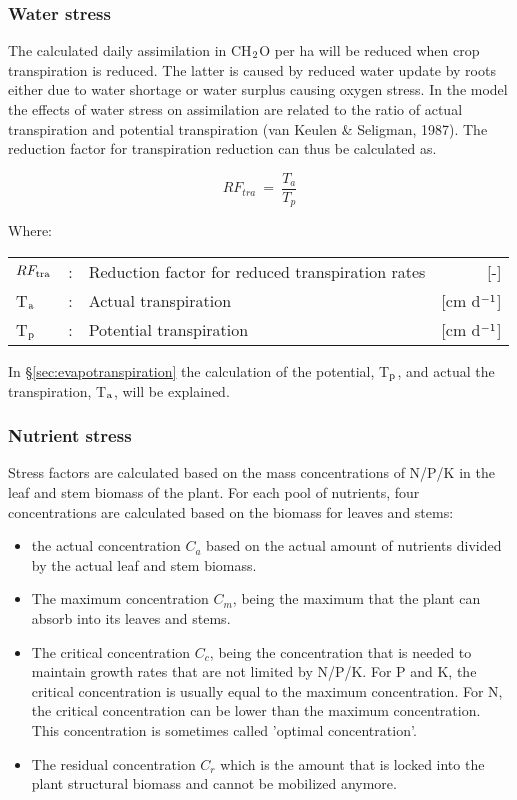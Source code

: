 \subsubsection{Water stress}
The calculated daily assimilation in CH$_{{\rm 2}}$O per ha will be reduced when crop transpiration
is reduced. The latter is caused by reduced water update by roots either due to water shortage or water 
surplus causing oxygen stress. In the model the effects of water stress on assimilation are related 
to the ratio of actual transpiration and potential transpiration (van Keulen \& Seligman, 1987).
The reduction factor for transpiration reduction can thus be calculated as.

\begin{equation}
\label{eq:5.37}
RF_{tra} ~=~ {\frac{T _{a} }{T _{p} }}
\end{equation}

Where:\\[5pt]
\begin{tabularx}{\textwidth}{llXr}
	$RF_{{\rm tra}}$ &:& Reduction factor for reduced transpiration rates   & [-]\\
	T$_{{\rm a}}$ &:& Actual transpiration   &     [cm d$^{{\rm -1}}$]\\
	T$_{{\rm p}}$ &:& Potential transpiration   &     [cm d$^{{\rm -1}}$]\\
\end{tabularx}

In \S \ref{sec:evapotranspiration} the calculation of the potential, T$_{{\rm p}}$, and actual 
the transpiration, T$_{{\rm a}}$, will be explained.

\subsubsection{Nutrient stress}

Stress factors are calculated based on the mass concentrations of N/P/K in
the leaf and stem biomass of the plant. For each pool of nutrients, four
concentrations are calculated based on the biomass for leaves and stems:
\begin{itemize}
	\item the actual concentration $C_{a}$ based on the actual amount of nutrients
	divided by the actual leaf and stem biomass.
	\item The maximum concentration $C_{m}$, being the maximum that the plant can absorb
	into its leaves and stems.
	\item The critical concentration $C_{c}$, being the concentration that is needed to
	maintain growth rates that are not limited by N/P/K. For P and K, the
	critical concentration is usually equal to the maximum concentration.
	For N, the critical concentration can be lower than the maximum
	concentration. This concentration is sometimes called 'optimal
	concentration'.
	\item The residual concentration $C_{r}$ which is the amount that is locked
	into the plant structural biomass and cannot be mobilized anymore.
\end{itemize}


